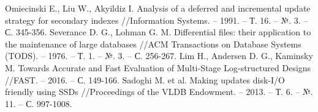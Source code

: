 \documentclass[a4paper,hidelinks,12pt]{article}
\begin{document}
\begin{thebibliography}{9}
 Omiecinski E., Liu W., Akyildiz I. Analysis of a deferred and incremental update strategy for secondary indexes //Information Systems. – 1991. – Т. 16. – №. 3. – С. 345-356.
 Severance D. G., Lohman G. M. Differential files: their application to the maintenance of large databases //ACM Transactions on Database Systems (TODS). – 1976. – Т. 1. – №. 3. – С. 256-267.
 Lim H., Andersen D. G., Kaminsky M. Towards Accurate and Fast Evaluation of Multi-Stage Log-structured Designs //FAST. – 2016. – С. 149-166.
 Sadoghi M. et al. Making updates disk-I/O friendly using SSDs //Proceedings of the VLDB Endowment. – 2013. – Т. 6. – №. 11. – С. 997-1008.

\end{thebibliography}
\end{document}
